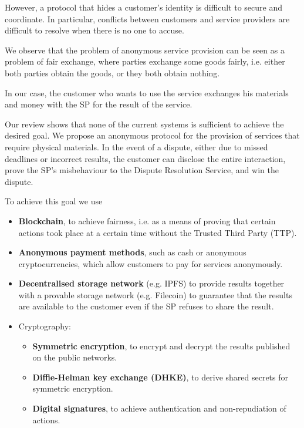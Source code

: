 \documentclass[pdftex,twocolumn,epjc3]{svjour3}
\begin{document}
However, a protocol that hides a customer's identity is difficult to secure and coordinate. In particular, conflicts between customers and service providers are difficult to resolve when there is no one to accuse.

We observe that the problem of anonymous service provision can be seen as a problem of fair exchange, where parties exchange some goods fairly, i.e. either both parties obtain the goods, or they both obtain nothing.

In our case, the customer who wants to use the service exchanges his materials and money with the SP for the result of the service.

Our review shows that none of the current systems is sufficient to achieve the desired goal. We propose an anonymous protocol for the provision of services that require physical materials. In the event of a dispute, either due to missed deadlines or incorrect results, the customer can disclose the entire interaction, prove the SP's misbehaviour to the Dispute Resolution Service, and win the dispute.

To achieve this goal we use
\begin{itemize}
    \item \textbf{Blockchain}, to achieve fairness, i.e. as a means of proving that certain actions took place at a certain time without the Trusted Third Party (TTP).
    \item \textbf{Anonymous payment methods}, such as cash or anonymous cryptocurrencies, which allow customers to pay for services anonymously.
\item \textbf{Decentralised storage network} (e.g. IPFS) to provide results together with a provable storage network (e.g. Filecoin) to guarantee that the results are available to the customer even if the SP refuses to share the result.
    
    \item Cryptography:
    \begin{itemize}
        \item \textbf{Symmetric encryption}, to encrypt and decrypt the results published on the public networks.
        \item \textbf{Diffie-Helman key exchange (DHKE)}, to derive shared secrets for symmetric encryption.
        \item \textbf{Digital signatures}, to achieve authentication and non-repudiation of actions. 
    \end{itemize}
    
\end{itemize}
\end{document}
